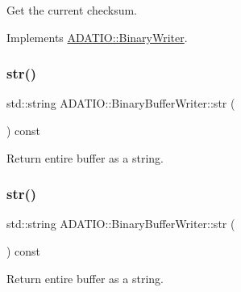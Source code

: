 Get the current checksum. 



Implements \mbox{\hyperlink{classADATIO_1_1BinaryWriter_ae64230370824192d1f0dbcaa8e74017a}{A\+D\+A\+T\+I\+O\+::\+Binary\+Writer}}.

\mbox{\label{classADATIO_1_1BinaryBufferWriter_a5c4f9b9c049173452e1cc70fe27ee188}} 
\subsubsection{\texorpdfstring{str()}{str()}\hspace{0.1cm}{\footnotesize\ttfamily [1/3]}}
{\footnotesize\ttfamily std\+::string A\+D\+A\+T\+I\+O\+::\+Binary\+Buffer\+Writer\+::str (\begin{DoxyParamCaption}{ }\end{DoxyParamCaption}) const}



Return entire buffer as a string. 

\mbox{\label{classADATIO_1_1BinaryBufferWriter_a5c4f9b9c049173452e1cc70fe27ee188}} 
\subsubsection{\texorpdfstring{str()}{str()}\hspace{0.1cm}{\footnotesize\ttfamily [2/3]}}
{\footnotesize\ttfamily std\+::string A\+D\+A\+T\+I\+O\+::\+Binary\+Buffer\+Writer\+::str (\begin{DoxyParamCaption}{ }\end{DoxyParamCaption}) const}



Return entire buffer as a string. 

